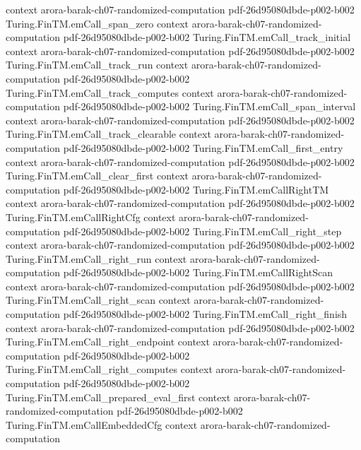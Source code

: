 \begin{theorem}
  {context}
  {arora-barak-ch07-randomized-computation}
  {pdf-26d95080dbde-p002-b002}
\proofstep
  {Turing.FinTM.emCall_span_zero}
  {context}
  {arora-barak-ch07-randomized-computation}
  {pdf-26d95080dbde-p002-b002}
\proofstep
  {Turing.FinTM.emCall_track_initial}
  {context}
  {arora-barak-ch07-randomized-computation}
  {pdf-26d95080dbde-p002-b002}
\proofstep
  {Turing.FinTM.emCall_track_run}
  {context}
  {arora-barak-ch07-randomized-computation}
  {pdf-26d95080dbde-p002-b002}
\proofstep
  {Turing.FinTM.emCall_track_computes}
  {context}
  {arora-barak-ch07-randomized-computation}
  {pdf-26d95080dbde-p002-b002}
\proofstep
  {Turing.FinTM.emCall_span_interval}
  {context}
  {arora-barak-ch07-randomized-computation}
  {pdf-26d95080dbde-p002-b002}
\proofstep
  {Turing.FinTM.emCall_track_clearable}
  {context}
  {arora-barak-ch07-randomized-computation}
  {pdf-26d95080dbde-p002-b002}
\proofstep
  {Turing.FinTM.emCall_first_entry}
  {context}
  {arora-barak-ch07-randomized-computation}
  {pdf-26d95080dbde-p002-b002}
\proofstep
  {Turing.FinTM.emCall_clear_first}
  {context}
  {arora-barak-ch07-randomized-computation}
  {pdf-26d95080dbde-p002-b002}
\proofstep
  {Turing.FinTM.emCallRightTM}
  {context}
  {arora-barak-ch07-randomized-computation}
  {pdf-26d95080dbde-p002-b002}
\proofstep
  {Turing.FinTM.emCallRightCfg}
  {context}
  {arora-barak-ch07-randomized-computation}
  {pdf-26d95080dbde-p002-b002}
\proofstep
  {Turing.FinTM.emCall_right_step}
  {context}
  {arora-barak-ch07-randomized-computation}
  {pdf-26d95080dbde-p002-b002}
\proofstep
  {Turing.FinTM.emCall_right_run}
  {context}
  {arora-barak-ch07-randomized-computation}
  {pdf-26d95080dbde-p002-b002}
\proofstep
  {Turing.FinTM.emCallRightScan}
  {context}
  {arora-barak-ch07-randomized-computation}
  {pdf-26d95080dbde-p002-b002}
\proofstep
  {Turing.FinTM.emCall_right_scan}
  {context}
  {arora-barak-ch07-randomized-computation}
  {pdf-26d95080dbde-p002-b002}
\proofstep
  {Turing.FinTM.emCall_right_finish}
  {context}
  {arora-barak-ch07-randomized-computation}
  {pdf-26d95080dbde-p002-b002}
\proofstep
  {Turing.FinTM.emCall_right_endpoint}
  {context}
  {arora-barak-ch07-randomized-computation}
  {pdf-26d95080dbde-p002-b002}
\proofstep
  {Turing.FinTM.emCall_right_computes}
  {context}
  {arora-barak-ch07-randomized-computation}
  {pdf-26d95080dbde-p002-b002}
\proofstep
  {Turing.FinTM.emCall_prepared_eval_first}
  {context}
  {arora-barak-ch07-randomized-computation}
  {pdf-26d95080dbde-p002-b002}
\proofstep
  {Turing.FinTM.emCallEmbeddedCfg}
  {context}
  {arora-barak-ch07-randomized-computation}

\end{theorem}
